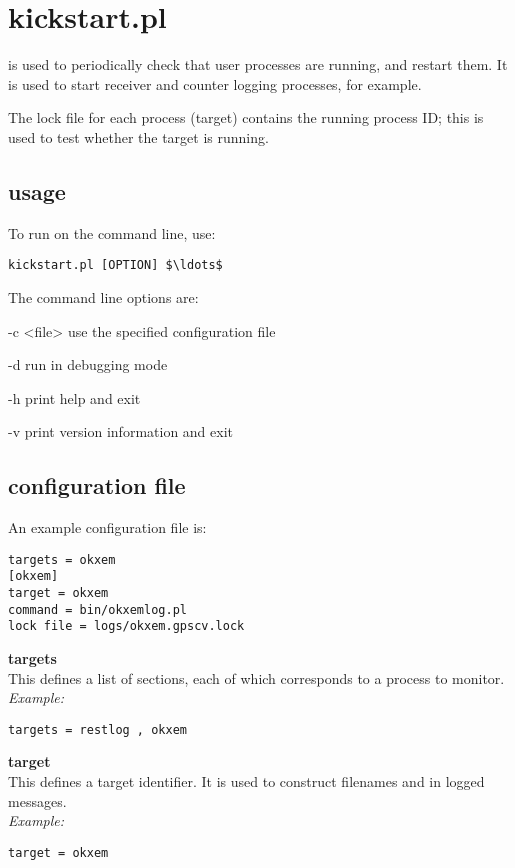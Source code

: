 \section{kickstart.pl \label{s:kickstart}}

 is used to periodically check that user processes are running,
and restart them. It is used to start receiver and counter logging processes, for example.

The lock file for each process (target) contains the running process ID; this is used to test whether the
target is running.

\subsection{usage}

To run  on the command line, use:
\begin{lstlisting}[mathescape=true]
kickstart.pl [OPTION] $\ldots$
\end{lstlisting}
The command line options are:
\begin{description*}
	\item[-c \textless file\textgreater] use the specified configuration file
	\item[-d]	run in debugging mode
	\item[-h]	print help and exit
	\item[-v]	print version information and exit
\end{description*}

\subsection{configuration file}

An example configuration file is:
\begin{lstlisting}
targets = okxem
[okxem]
target = okxem
command = bin/okxemlog.pl 
lock file = logs/okxem.gpscv.lock
\end{lstlisting}


{\bfseries targets}\\
This defines a list of sections, each of which corresponds to a process to monitor.\\
\textit{Example:}
\begin{lstlisting}
targets = restlog , okxem
\end{lstlisting}

{\bfseries target}\\
This defines a target identifier. It is used to construct filenames and in logged messages.\\
\textit{Example:}
\begin{lstlisting}
target = okxem
\end{lstlisting}

